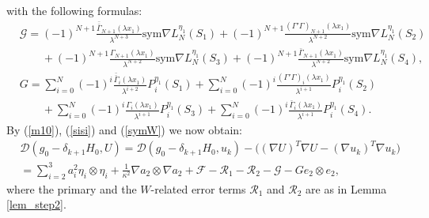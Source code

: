 \documentclass[reqno,twoside,11pt]{amsart}
\newcommand{\sym}{\mathrm{sym}}
\newcommand*{\dbar}[1]{\bar{\bar{#1}}}
\numberwithin{equation}{section}
\theoremstyle{plain}
\theoremstyle{definition}
\begin{document}
with the following formulas:
\begin{equation*}
\begin{split}
& \mathcal{G} = (-1)^{N+1} \frac{\dbar\Gamma_{N+1}(\lambda
  x_1)}{\lambda^{N+3}}\sym \nabla L_N^{\eta_1}(S_1) 
+ (-1)^{N+1} \frac{(\Gamma'\Gamma)_{N+1}(\lambda
  x_1)}{\lambda^{N+2}}\sym\nabla L_N^{\eta_1}(S_2) 
\\ & \qquad + (-1)^{N+1} \frac{\Gamma_{N+1}(\lambda
  x_1)}{\lambda^{N+2}}\sym\nabla L_N^{\eta_1}(S_3) 
+ (-1)^{N+1} \frac{\bar\Gamma_{N+1}(\lambda
  x_1)}{\lambda^{N+2}}\sym\nabla L_N^{\eta_1}(S_4), \\
& G = \sum_{i=0}^N (-1)^i \frac{\dbar\Gamma_{i}(\lambda x_1)}{\lambda^{i+2}}P_i^{\eta_1}(S_1) 
+ \sum_{i=0}^N (-1)^i \frac{(\Gamma'\Gamma)_{i}(\lambda x_1)}{\lambda^{i+1}}P_i^{\eta_1}(S_2) 
\\ & \qquad + \sum_{i=0}^N (-1)^i \frac{\Gamma_{i}(\lambda x_1)}{\lambda^{i+1}}P_i^{\eta_1}(S_3) 
+ \sum_{i=0}^N (-1)^i \frac{\bar\Gamma_{i}(\lambda x_1)}{\lambda^{i+1}}P_i^{\eta_1}(S_4). 
\end{split}
\end{equation*}
By (\ref{m10}), (\ref{sisi})  and (\ref{symW}) we now obtain: 
\begin{equation}\label{m12}
\begin{split}
& \mathcal{D}(g_0-\delta_{k+1}H_0, U) = \mathcal{D}(g_0-\delta_{k+1}H_0,
u_k) -\Big((\nabla U)^T\nabla U - (\nabla u_k)^T\nabla u_k\Big) \\ & =
\sum_{i=2}^3a_i^2\eta_i\otimes\eta_i + \frac{1}{\kappa^2}\nabla
a_2\otimes\nabla a_2 + \mathcal{F} -\mathcal{R}_1  - \mathcal{R}_2
-\mathcal{G} -Ge_2\otimes e_2,
\end{split}
\end{equation}
where the primary and the $W$-related error terms
$\mathcal{R}_1$ and $\mathcal{R}_2$ are as in Lemma \ref{lem_step2}. 

\smallskip
\end{document}
